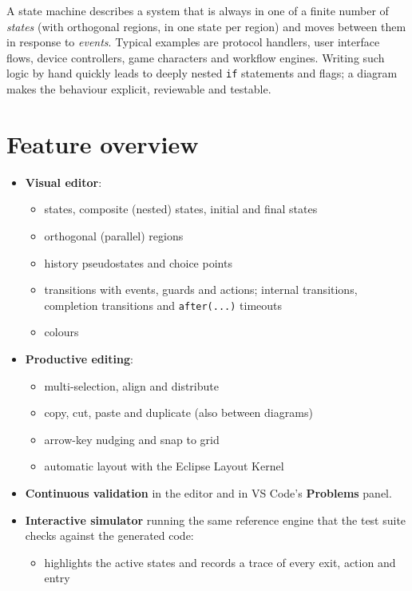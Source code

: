 \documentclass[11pt,a4paper,openany]{report}
\newcommand{\ui}[1]{\textsf{\textbf{#1}}}
\newcommand{\code}[1]{\texttt{#1}}
\begin{document}
A state machine describes a system that is always in one of a finite number of \emph{states} (with
orthogonal regions, in one state per region) and moves between them in response to \emph{events}. Typical examples are protocol handlers, user
interface flows, device controllers, game characters and workflow engines. Writing such logic by hand
quickly leads to deeply nested \code{if} statements and flags; a diagram makes the behaviour explicit,
reviewable and testable.

\section{Feature overview}
\begin{itemize}[itemsep=1pt]
  \item \textbf{Visual editor}:
        \begin{itemize}[itemsep=0pt]
          \item states, composite (nested) states, initial and final states
          \item orthogonal (parallel) regions
          \item history pseudostates and choice points
          \item transitions with events, guards and actions; internal transitions, completion
                transitions and \code{after(...)} timeouts
          \item colours
        \end{itemize}
  \item \textbf{Productive editing}:
        \begin{itemize}[itemsep=0pt]
          \item multi-selection, align and distribute
          \item copy, cut, paste and duplicate (also between diagrams)
          \item arrow-key nudging and snap to grid
          \item automatic layout with the Eclipse Layout Kernel
        \end{itemize}
  \item \textbf{Continuous validation} in the editor and in VS Code's \ui{Problems} panel.
  \item \textbf{Interactive simulator} running the same reference engine that the test suite checks
        against the generated code:
        \begin{itemize}[itemsep=0pt]
          \item highlights the active states and records a trace of every exit, action and entry

\end{itemize}
\end{itemize}
\end{document}
